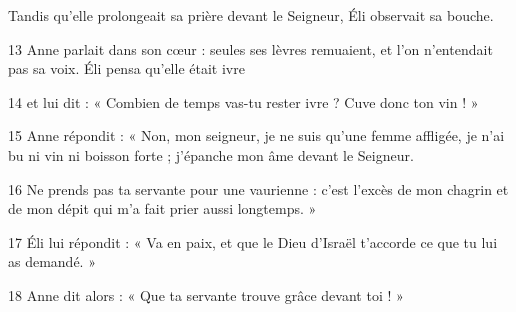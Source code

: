Tandis qu’elle prolongeait sa prière devant le Seigneur, Éli observait sa bouche.

13 Anne parlait dans son cœur : seules ses lèvres remuaient, et l’on n’entendait pas sa voix. Éli pensa qu’elle était ivre

14 et lui dit : « Combien de temps vas-tu rester ivre ? Cuve donc ton vin ! »

15 Anne répondit : « Non, mon seigneur, je ne suis qu’une femme affligée, je n’ai bu ni vin ni boisson forte ; j’épanche mon âme devant le Seigneur.

16 Ne prends pas ta servante pour une vaurienne : c’est l’excès de mon chagrin et de mon dépit qui m’a fait prier aussi longtemps. »

17 Éli lui répondit : « Va en paix, et que le Dieu d’Israël t’accorde ce que tu lui as demandé. »

18 Anne dit alors : « Que ta servante trouve grâce devant toi ! » 